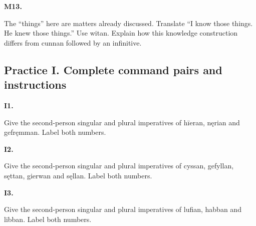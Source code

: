 \par\begin{minipage}{\linewidth}\raggedright
\textbf{M13.}

The “things” here are matters already discussed. Translate “I know those things. He knew those things.” Use witan. Explain how this knowledge construction differs from cunnan followed by an infinitive.

\end{minipage}\par\addvspace{4pt}

\subsection*{Practice I. Complete command pairs and instructions}

\par\begin{minipage}{\linewidth}\raggedright
\textbf{I1.}

Give the second-person singular and plural imperatives of hīeran, nęrian and gefręmman. Label both numbers.

\end{minipage}\par\addvspace{4pt}

\par\begin{minipage}{\linewidth}\raggedright
\textbf{I2.}

Give the second-person singular and plural imperatives of cyssan, gefyllan, sęttan, gierwan and sęllan. Label both numbers.

\end{minipage}\par\addvspace{4pt}

\par\begin{minipage}{\linewidth}\raggedright
\textbf{I3.}

Give the second-person singular and plural imperatives of lufian, habban and libban. Label both numbers.

\end{minipage}\par\addvspace{4pt}

